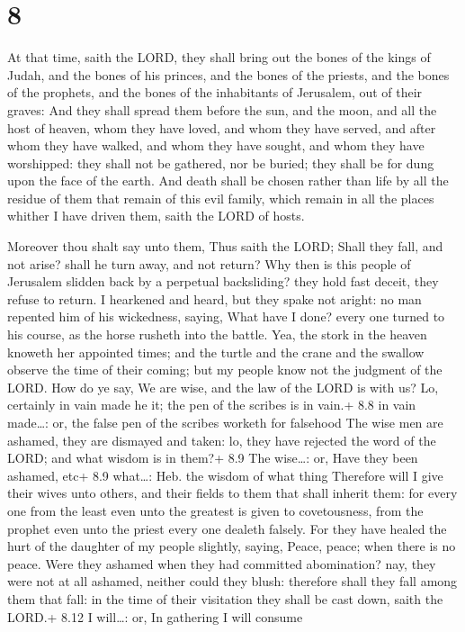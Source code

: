 \hypertarget{section-7}{%
\section{8}\label{section-7}}

 At that time, saith the LORD, they shall bring out the
bones of the kings of Judah, and the bones of his princes, and the bones
of the priests, and the bones of the prophets, and the bones of the
inhabitants of Jerusalem, out of their graves:  And they
shall spread them before the sun, and the moon, and all the host of
heaven, whom they have loved, and whom they have served, and after whom
they have walked, and whom they have sought, and whom they have
worshipped: they shall not be gathered, nor be buried; they shall be for
dung upon the face of the earth.  And death shall be chosen
rather than life by all the residue of them that remain of this evil
family, which remain in all the places whither I have driven them, saith
the LORD of hosts.

 Moreover thou shalt say unto them, Thus saith the LORD;
Shall they fall, and not arise? shall he turn away, and not return?
 Why then is this people of Jerusalem slidden back by a
perpetual backsliding? they hold fast deceit, they refuse to return.
 I hearkened and heard, but they spake not aright: no man
repented him of his wickedness, saying, What have I done? every one
turned to his course, as the horse rusheth into the battle. 
Yea, the stork in the heaven knoweth her appointed times; and the turtle
and the crane and the swallow observe the time of their coming; but my
people know not the judgment of the LORD.  How do ye say, We
are wise, and the law of the LORD is with us? Lo, certainly in vain made
he it; the pen of the scribes is in vain.+ 8.8 in vain made\ldots: or,
the false pen of the scribes worketh for falsehood  The wise
men are ashamed, they are dismayed and taken: lo, they have rejected the
word of the LORD; and what wisdom is in them?+ 8.9 The wise\ldots: or,
Have they been ashamed, etc+ 8.9 what\ldots: Heb. the wisdom of what
thing  Therefore will I give their wives unto others, and
their fields to them that shall inherit them: for every one from the
least even unto the greatest is given to covetousness, from the prophet
even unto the priest every one dealeth falsely.  For they
have healed the hurt of the daughter of my people slightly, saying,
Peace, peace; when there is no peace.  Were they ashamed
when they had committed abomination? nay, they were not at all ashamed,
neither could they blush: therefore shall they fall among them that
fall: in the time of their visitation they shall be cast down, saith the
LORD.+ 8.12 I will\ldots: or, In gathering I will consume

